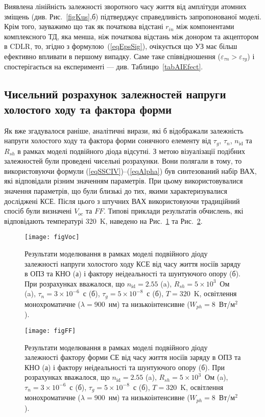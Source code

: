 Виявлена лінійність залежності зворотного часу життя від амплітуди атомних зміщень (див. Рис.~\ref{figKus},б) підтверджує
справедливість запропонованої моделі.
Крім того, зауважимо що так як початкова відстані $r_{in}$ між компонентами комплексного ТД, яка  менша, ніж початкова відстань між донором та акцептором в CDLR,
то, згідно з формулою~(\ref{eqEpsSig}), очікується що УЗ має більш ефективно впливати в першому випадку.
Саме таке співвідношення ($\varepsilon_{\tau n}>\varepsilon_{\tau g}$) і спостерігається на експерименті --- див. Таблицю~\ref{tabAIEfect}.


\subsection{Чисельний розрахунок залежностей напруги холостого ходу та фактора форми\label{sbVocSim}}

Як вже згадувалося раніше,
аналітичні вирази, які б відображали залежність напруги холостого ходу та фактора форми сонячного елементу
від $\tau_g$, $\tau_n$, $n_{\mathrm{id}}$ та $R_{sh}$ в рамках  моделі подвійного діода відсутні.
З метою візуалізації подібних залежностей були проведені чисельні розрахунки.
Вони полягали в тому, то використовуючи
формули (\ref{eqSSCIV})--(\ref{eqAlpha}) був синтезований набір ВАХ, які відповідали різним
значенням параметрів.
При цьому використовувалися значення параметрів, що були близькі до тих, якими характеризувалися досліджені КСЕ.
Після цього з штучних ВАХ використовуючи традиційний спосіб були визначені $V_{oc}$ та $F\!F$.
Типові приклади результатів обчислень, які відповідають температурі 320~K, наведено на Рис.~\ref{figVoc} та Рис.~\ref{figFF}.


\begin{figure}
\center
\texttt{[image: figVoc]}
\caption{\label{figVoc}
Результати моделювання в рамках моделі подвійного діоду залежності напруги холостого ходу КСЕ від часу життя носіїв заряду в ОПЗ та КНО (а) і
фактору неідеальності та шунтуючого опору (б).
При розрахунках вважалося, що $n_\mathrm{id}=2.55$ (a), $R_{sh}=5\times10^3$~Ом (a), $\tau_n=3\times10^{-6}$~с (б), $\tau_g=5\times10^{-8}$~с (б), $T=320$~K,
освітлення монохроматичне ($\lambda=900$~нм) та низькоінтенсивне ($W_{ph}=8$~Вт/м$^2$).
}%
\end{figure}


\begin{figure}
\center
\texttt{[image: figFF]}
\caption{\label{figFF}
Результати моделювання в рамках моделі подвійного діоду залежності фактору форми СЕ від часу життя носіїв заряду в ОПЗ та КНО (а) і
фактору неідеальності та шунтуючого опору (б).
При розрахунках вважалося, що $n_\mathrm{id}=2.55$ (a), $R_{sh}=5\times10^3$~Ом (a), $\tau_n=3\times10^{-6}$~с (б), $\tau_g=5\times10^{-8}$~с (б), $T=320$~K,
освітлення монохроматичне ($\lambda=900$~нм) та низькоінтенсивне ($W_{ph}=8$~Вт/м$^2$).
}%
\end{figure}

